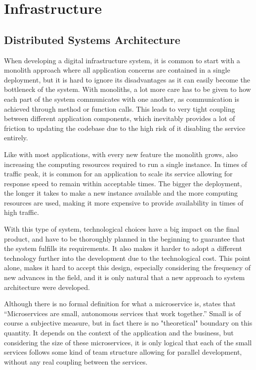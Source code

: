 \chapter{Infrastructure} \label{chap:infrastructure}

\section{Distributed Systems Architecture}

When developing a digital infrastructure system, it is common to start with a
monolith approach where all application concerns are contained in a single
deployment, but it is hard to ignore its disadvantages as it can easily become
the bottleneck of the system. With monoliths, a lot more care has to be given to
how each part of the system communicates with one another, as communication is
achieved through method or function calls. This leads to very tight coupling
between different application components, which inevitably provides a lot of
friction to updating the codebase due to the high risk of it disabling the
service entirely.

Like with most applications, with every new feature the monolith grows, also
increasing the computing resources required to run a single instance. In times
of traffic peak, it is common for an application to scale its service allowing
for response speed to remain within acceptable times. The bigger the deployment,
the longer it takes to make a new instance available and the more computing
resources are used, making it more expensive to provide availability in times of
high traffic.

With this type of system, technological choices have a big impact on the final
product, and have to be thoroughly planned in the beginning to guarantee that
the system fulfills its requirements. It also makes it harder to adopt a
different technology further into the development due to the technological cost.
This point alone, makes it hard to accept this design, especially considering
the frequency of new advances in the field, and it is only natural that a new
approach to system architecture were developed.

Although there is no formal definition for what a microservice is,
\cite[Chapter~1]{newman2015building} states that ``Microservices are small,
autonomous services that work together.'' Small is of course a subjective
measure, but in fact there is no "theoretical" boundary on this quantity. It
depends on the context of the application and the business, but considering the
size of these microservices, it is only logical that each of the small services
follows some kind of team structure allowing for parallel development, without
any real coupling between the services. 

